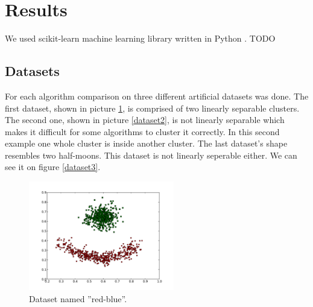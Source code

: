 \documentclass[conference]{IEEEtran}
\begin{document}

\section{Results}
We used scikit-learn machine learning library written in Python \cite{scikit}. TODO

\subsection{Datasets}

For each algorithm comparison on three different artificial datasets was done. The first dataset, shown in picture \ref{dataset1},
is comprised of two linearly separable clusters. The second one, shown in picture \ref{dataset2}, is not linearly separable
which makes it difficult for some algorithms to cluster it correctly. In this second example one
whole cluster is inside another cluster. The last dataset's shape resembles two half-moons. This dataset is
not linearly seperable either. We can see it on figure \ref{dataset3}.

\begin{figure}[th]
\centering
\includegraphics[width=15pc]{red-blue-clusters.pdf}
\caption{Dataset named ''red-blue''.}
\label{dataset1}
\end{figure}
\end{document}

